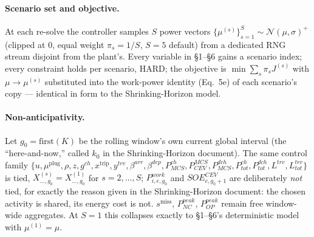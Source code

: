 \documentclass[11pt]{article}
\begin{document}
\paragraph{Scenario set and objective.} At each re-solve the controller samples $S$ power
vectors $\{\mu^{(s)}\}_{s=1}^S \sim \mathcal N(\mu,\sigma)^+$ (clipped at 0, equal weight
$\pi_s=1/S$, $S=5$ default) from a dedicated RNG stream disjoint from the plant's. Every
variable in \S1--\S6 gains a scenario index; every constraint holds per scenario, HARD; the
objective is $\min \sum_s \pi_s J^{(s)}$ with $\mu\to\mu^{(s)}$ substituted into the work-power
identity (Eq.~5e) of each scenario's copy — identical in form to the Shrinking-Horizon model.

\paragraph{Non-anticipativity.} Let $g_0=\text{first}(K)$ be the rolling window's own current
global interval (the ``here-and-now,'' called $k_0$ in the Shrinking-Horizon document). The
same control family
$\{u,\mu^{\text{plug}},\rho,z,g^{ch},x^{\text{trip}},y^{trv},\beta^{arr},\beta^{dep},
P^{ch}_{MCS},P^{MCS}_{CEV},P^{dch}_{MCS},P^{ch}_{tot},P^{dch}_{tot},L^{trv},L^{trv}_{tot}\}$
is tied, $X^{(s)}_{\dots,g_0}=X^{(1)}_{\dots,g_0}$ for $s=2,\dots,S$; $P^{work}_{i,e,g_0}$ and
$SOE^{CEV}_{e,g_0+1}$ are deliberately \emph{not} tied, for exactly the reason given in the
Shrinking-Horizon document: the chosen activity is shared, its energy cost is not. $s^{\text{miss}}$,
$P^{peak}_{NC}$, $P^{peak}_{OP}$ remain free window-wide aggregates. At $S=1$ this collapses
exactly to \S1--\S6's deterministic model with $\mu^{(1)}=\mu$.
\end{document}
